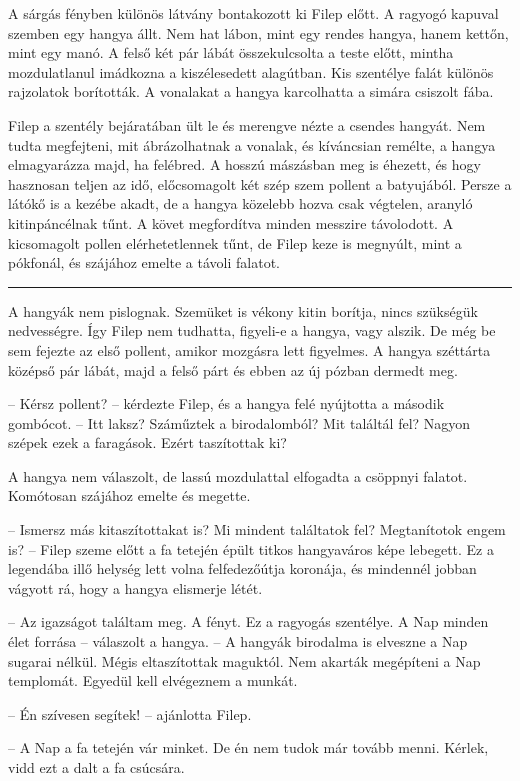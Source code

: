 \documentclass[10pt]{memoir}
\renewcommand{\pfbreakdisplay}{\bigskip \ding{166} \bigskip}
\newcommand{\secbreak}{\fancybreak{\pfbreakdisplay}\indent}
\begin{document}
A sárgás fényben különös látvány bontakozott ki Filep előtt. A ragyogó kapuval
szemben egy hangya állt. Nem hat lábon, mint egy rendes hangya, hanem kettőn,
mint egy manó. A felső két pár lábát összekulcsolta a teste előtt, mintha
mozdulatlanul imádkozna a kiszélesedett alagútban. Kis szentélye falát különös
rajzolatok borították. A vonalakat a hangya karcolhatta a simára csiszolt fába.

Filep a szentély bejáratában ült le és merengve nézte a csendes hangyát. Nem
tudta megfejteni, mit ábrázolhatnak a vonalak, és kíváncsian remélte, a hangya
elmagyarázza majd, ha felébred. A hosszú mászásban meg is éhezett, és hogy
hasznosan teljen az idő, előcsomagolt két szép szem pollent a batyujából.
Persze a látókő is a kezébe akadt, de a hangya közelebb hozva csak végtelen,
aranyló kitinpáncélnak tűnt. A követ megfordítva minden messzire távolodott. A
kicsomagolt pollen elérhetetlennek tűnt, de Filep keze is megnyúlt, mint a
pókfonál, és szájához emelte a távoli falatot.

\secbreak

A hangyák nem pislognak. Szemüket is vékony kitin borítja, nincs szükségük
nedvességre. Így Filep nem tudhatta, figyeli-e a hangya, vagy alszik. De még be
sem fejezte az első pollent, amikor mozgásra lett figyelmes. A hangya széttárta
középső pár lábát, majd a felső párt és ebben az új pózban dermedt meg.

-- Kérsz pollent? -- kérdezte Filep, és a hangya felé nyújtotta a második
gombócot. -- Itt laksz? Száműztek a birodalomból? Mit találtál fel? Nagyon
szépek ezek a faragások. Ezért taszítottak ki?

A hangya nem válaszolt, de lassú mozdulattal elfogadta a csöppnyi falatot.
Komótosan szájához emelte és megette.

-- Ismersz más kitaszítottakat is? Mi mindent találtatok fel? Megtanítotok
engem is? -- Filep szeme előtt a fa tetején épült titkos hangyaváros képe
lebegett. Ez a legendába illő helység lett volna felfedezőútja koronája, és
mindennél jobban vágyott rá, hogy a hangya elismerje létét.

-- Az igazságot találtam meg. A fényt. Ez a ragyogás szentélye. A Nap minden
élet forrása -- válaszolt a hangya. -- A hangyák birodalma is elveszne a Nap
sugarai nélkül. Mégis eltaszítottak maguktól. Nem akarták megépíteni a Nap
templomát. Egyedül kell elvégeznem a munkát.

-- Én szívesen segítek! -- ajánlotta Filep.

-- A Nap a fa tetején vár minket. De én nem tudok már tovább menni. Kérlek,
vidd ezt a dalt a fa csúcsára.
\end{document}
